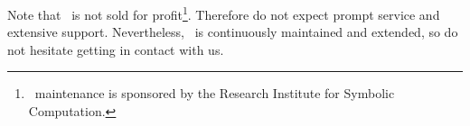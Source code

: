 Note that \saclib\ is not sold for profit\footnote{
  \saclib\ maintenance is sponsored by the Research Institute for Symbolic
  Computation.  
}.
Therefore do not expect prompt service and extensive support.  Nevertheless,
\saclib\ is continuously maintained and extended, so do not hesitate getting
in contact with us.

